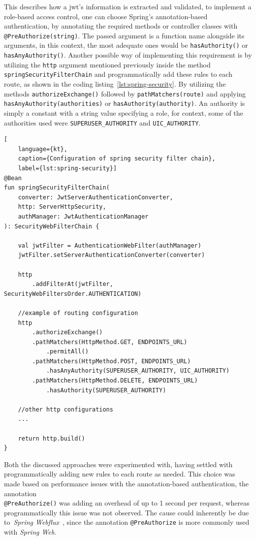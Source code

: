 This describes how a \acrshort{jwt}'s information is extracted and validated, to implement a role-based access control, one can choose Spring's annotation-based authentication, by annotating the required methods or controller classes with \lstinline{@PreAuthorize(string)}. The passed argument is a function name alongside its arguments, in this context, the most adequate ones would be \lstinline{hasAuthority()} or \lstinline{hasAnyAuthority()}. Another possible way of implementing this requirement is by utilizing the \lstinline{http} argument mentioned previously inside the method \lstinline{springSecurityFilterChain} and programmatically add these rules to each route, as shown in the coding listing~\ref{lst:spring-security}. By utilizing the methods \lstinline{authorizeExchange()} followed by \lstinline{pathMatchers(route)} and applying \lstinline{hasAnyAuthority(authorities)} or \lstinline{hasAuthority(authority)}. An authority is simply a constant with a string value specifying a role, for context, some of the authorities used were \lstinline{SUPERUSER_AUTHORITY} and \lstinline{UIC_AUTHORITY}. 


\begin{lstlisting}[
    language={kt}, 
    caption={Configuration of spring security filter chain},
    label={lst:spring-security}]
@Bean
fun springSecurityFilterChain(
    converter: JwtServerAuthenticationConverter,
    http: ServerHttpSecurity,
    authManager: JwtAuthenticationManager
): SecurityWebFilterChain {

    val jwtFilter = AuthenticationWebFilter(authManager)
    jwtFilter.setServerAuthenticationConverter(converter)

    http
        .addFilterAt(jwtFilter, SecurityWebFiltersOrder.AUTHENTICATION)

    //example of routing configuration
    http
        .authorizeExchange()
        .pathMatchers(HttpMethod.GET, ENDPOINTS_URL)
            .permitAll()
        .pathMatchers(HttpMethod.POST, ENDPOINTS_URL)
            .hasAnyAuthority(SUPERUSER_AUTHORITY, UIC_AUTHORITY)
        .pathMatchers(HttpMethod.DELETE, ENDPOINTS_URL)
            .hasAuthority(SUPERUSER_AUTHORITY)
             
    //other http configurations
    ...
            
    return http.build()
}
\end{lstlisting}

Both the discussed approaches were experimented with, having settled with programmatically adding new rules to each route as needed. This choice was made based on performance issues with the annotation-based authentication, the annotation \\\lstinline{@PreAuthorize()} was adding an overhead of up to 1 second per request, whereas programmatically this issue was not observed. The cause could inherently be due to~\textit{Spring Webflux}~\cite{spring-webflux}, since the annotation \lstinline{@PreAuthorize} is more commonly used with \textit{Spring Web}.


